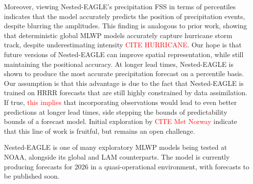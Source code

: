 \documentclass[11pt]{article}
\newcommand{\red}[1]{\textcolor{red}{#1}}
\begin{document}
Moreover, viewing Nested-EAGLE's precipitation FSS in terms of percentiles
indicates that the model accurately predicts the position of precipitation
events, despite blurring the amplitudes.
This finding is analogous to prior work, showing that deterministic global MLWP
models accurately capture hurricane storm track, despite underestimating
intensity \red{CITE HURRICANE}.
Our hope is that future versions of Nested-EAGLE can improve spatial
representation, while still maintaining the positional accuracy.
At longer lead times, Nested-EAGLE is shown to produce the most accurate
precipitation forecast on a percentile basis.
Our assumption is that this advantage is due to the fact that Nested-EAGLE is
trained on HRRR forecasts that are still highly constrained by data
assimilation.
If true, \red{this implies} that incorporating observations would lead to even
better predictions at longer lead times, side stepping the bounds of
predictability bounds of a forecast model.
Initial exploration by \red{CITE Met Norway} indicate that this line of work is
fruitful, but remains an open challenge.

Nested-EAGLE is one of many exploratory MLWP models being tested at NOAA,
alongside its global \citep{sadeghi_tabas_gfs-powered_2025} and
LAM \citep{abdi_hrrrcast_2026} counterparts.
The model is currently producing forecasts for 2026 in a quasi-operational
environment, with forecasts to be published soon.




\end{document}
